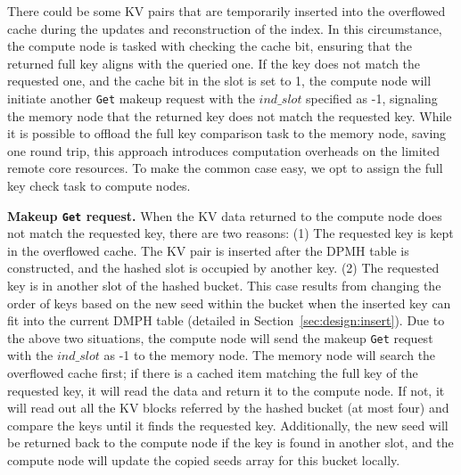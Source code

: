 There could be some KV pairs that are temporarily inserted into the overflowed cache during the updates and reconstruction of the index. %
In this circumstance, the compute node is tasked with checking the cache bit, ensuring that the returned full key aligns with the queried one. If the key does not match the requested one, and the cache bit in the slot is set to 1, the compute node will initiate another \texttt{Get} makeup request with the $ind\_slot$ specified as -1, signaling the memory node that the returned key does not match the requested key.
While it is possible to offload the full key comparison task to the memory node, saving one round trip, this approach introduces computation overheads on the limited remote core resources. To make the common case easy, we opt to assign the full key check task to compute nodes.



\textbf{Makeup \texttt{Get} request.}
When the KV data returned to the compute node does not match the requested key, there are two reasons: (1) The requested key is kept in the overflowed cache. The KV pair is inserted after the DPMH table is constructed, and the hashed slot is occupied by another key. 
(2) The requested key is in another slot of the hashed bucket. This case results from changing the order of keys based on the new seed within the bucket when the inserted key can fit into the current DMPH table (detailed in Section~\ref{sec:design:insert}). 
Due to the above two situations, the compute node will send the makeup \texttt{Get} request with the $ind\_slot$ as -1 to the memory node.
The memory node will search the overflowed cache first; if there is a cached item matching the full key of the requested key, it will read the data and return it to the compute node. 
If not, it will read out all the KV blocks referred by the hashed bucket (at most four) and compare the keys until it finds the requested key. 
Additionally, the new seed will be returned back to the compute node if the key is found in another slot, and the compute node will update the copied seeds array for this bucket locally.

\vspace{-1.5ex}

